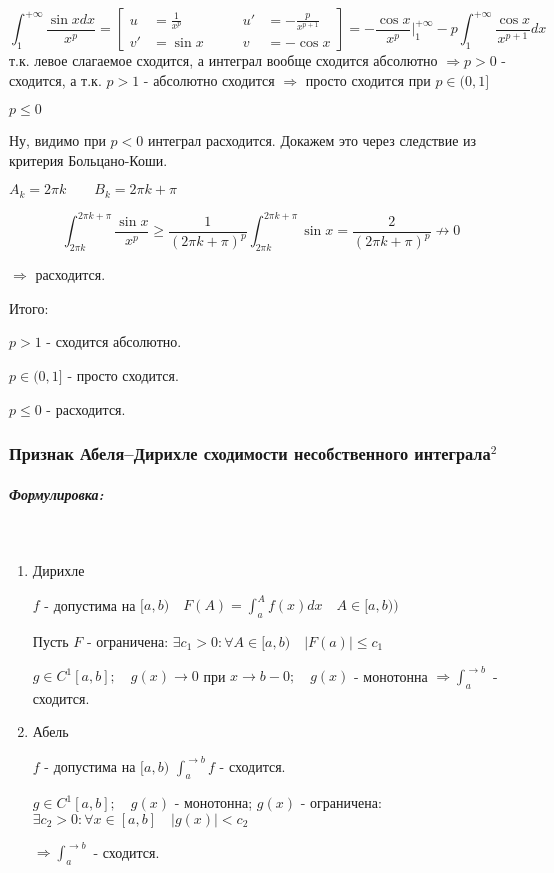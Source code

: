 \documentclass{article}
\let\vanillasubparagraph\subparagraph
\renewcommand{\subparagraph}[1]{\vanillasubparagraph{#1}\mbox{}\\}
\begin{document}
    $$
    \int_{1}^{+\infty}\frac{\sin{x} dx} {x^p} = 
    \left[
        \begin{alignedat} {2}
            u &= \frac{1}{x^p} \qquad &u' &= -\frac{p}{x^{p+1}} \\
            v' &= \sin{x} \qquad &v &= -\cos{x}
        \end{alignedat}
    \right]
    = -\frac{\cos{x}}{x^p} |_{1}^{+\infty} - p \int _{1}^{+\infty} \frac{\cos{x}}{x^{p + 1}} dx 
    $$
    т.к. левое слагаемое сходится, а интеграл вообще сходится абсолютно $\Rightarrow p > 0$ - сходится, а т.к. $p > 1$ - абсолютно сходится $\Rightarrow$ просто сходится при $p \in (0, 1]$

$p \leq 0$

    Ну, видимо при $p < 0$ интеграл расходится. Докажем это через следствие из критерия Больцано-Коши.

$A_k = 2\pi k \qquad B_k = 2\pi k + \pi$

$$
\int_{2\pi k}^{2\pi k + \pi} \frac{\sin{x}}{x^p} \geq \frac{1}{(2\pi k + \pi)^p} \int_{2\pi k} ^ {2\pi k + \pi} \sin{x} = \frac{2}{(2\pi k + \pi)^p} \nrightarrow 0
$$

$\Rightarrow$ расходится.

Итого:

$p > 1$ - сходится абсолютно.

$p \in (0, 1]$ - просто сходится.

$p \leq 0$ - расходится.

\subsubsection{Признак Абеля--Дирихле сходимости несобственного интеграла\texorpdfstring{$^2$}{}}

\subparagraph{Формулировка: }
\begin{enumerate}
    \item Дирихле

        $f$ - допустима на $[a, b) \quad F(A) = \int_a^A f(x) dx \quad A \in [a, b))$

        Пусть $F$ - ограничена: $\exists c_1 > 0: \forall A \in [a, b)\quad |F(a)| \leq c_1$

        $g \in C^1[a, b];\quad g(x) \to 0$ при $x \to b - 0;\quad g(x)$ - монотонна $\Rightarrow \int_{a}^{\to b}$ - сходится.

    \item Абель

        $f$ - допустима на $[a, b)$ $\int_a^{\to b} f$ - сходится. 

        $g \in C^1[a, b]; \quad g(x) $ - монотонна; $g(x)$ - ограничена: $\exists c_2 > 0: \forall x \in [a, b]\quad | g(x)| < c_2$

        $\Rightarrow \int_a^{\to b}$ - сходится.
\end{enumerate}
\end{document}

